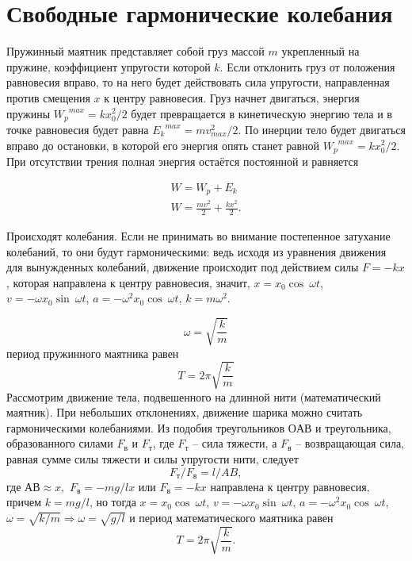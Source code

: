 \documentclass[a6paper, 11pt]{diss_4}
\renewcommand{\'}{\,'}
\begin{document}
\section{Свободные гармонические колебания}
Пружинный маятник представляет собой груз массой $m$ укрепленный на пружине, коэффициент
упругости которой $k$. Если отклонить груз от положения равновесия вправо, то на него
будет действовать сила упругости, направленная против смещения $x$ к центру равновесия.
Груз начнет двигаться, энергия пружины ${W_p}^{max}=kx_0^2/2$ будет превращается в
кинетическую энергию тела и в точке равновесия будет равна ${E_k}^{max}=mv^2_{max}/2$. По
инерции тело будет двигаться вправо до остановки, в которой его энергия  опять станет
равной ${W_p}^{max}=kx_0^2/2$.  При отсутствии трения полная энергия остаётся постоянной
и равняется

\begin{gather*}
W={W_p+E_k}\\
W=\frac{mv^2}{2}+\frac{kx^2}{2}.
\end{gather*}

Происходят колебания. Если не принимать во внимание постепенное затухание колебаний, то
они будут гармоническими: ведь исходя из уравнения движения для вынужденных колебаний,
движение происходит под действием силы $F=-kx$, которая направлена к центру равновесия,
значит, $x=x_0\cos\ \omega t$, $v = -\omega x_0 \sin\ \omega t$, $a= -\omega^2 x_0 \cos\
\omega t$, $k=m\omega^2$.

\[
\omega=\sqrt{\frac{k}{m}}
\]
период пружинного маятника равен
\[
T=2\pi\sqrt{\frac{k}{m}}
\]
Рассмотрим движение тела, подвешенного на длинной  нити (математический маятник). При небольших отклонениях, движение шарика можно считать гармоническими колебаниями.   Из подобия треугольников $ОАВ$ и треугольника, образованного силами $F_в$ и  $F_т$, где  $F_т$ -- сила тяжести, а $F_в$ -- возвращающая сила, равная сумме силы тяжести и силы упругости нити, следует
\[
F_т/F_в=l/AB,
\]
где $АВ\approx x,$ $F_в = -{mg}/{l}x$ или $ F_в =-kx$  направлена к центру равновесия,
причем $k=mg/l$, но тогда $x=x_0\cos\ \omega t$, $v= -\omega x_0\sin\ \omega t$,  $a=
-\omega^2x_0\cos\ \omega t$, $\omega=\sqrt{{k}/{m}}\Rightarrow\omega=\sqrt{{g}/{l}}$ и
период математического маятника равен
\[
T=2\pi\sqrt{\frac{k}{m}}.
\]
\end{document}
